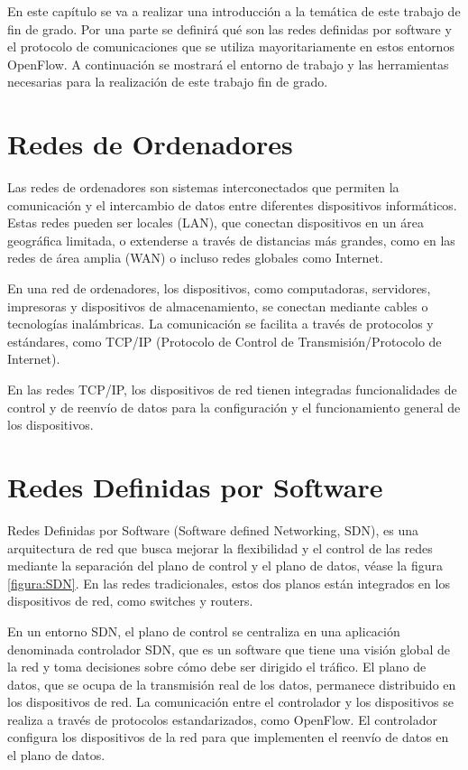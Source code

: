 \documentclass[a4paper, 12pt]{book}
\begin{document}
	
	En este capítulo se va a realizar una introducción a la temática de este trabajo de fin de grado. Por una
	parte se definirá qué son las redes definidas por software y el protocolo de comunicaciones que
	se utiliza mayoritariamente en estos entornos OpenFlow. A continuación se mostrará el entorno
	de trabajo y las herramientas necesarias para la realización de este trabajo fin de grado.
	
	
	\section{Redes de Ordenadores} 
	\label{sec:redes}
	
	Las redes de ordenadores son sistemas interconectados que permiten la comunicación y el intercambio de datos entre diferentes dispositivos informáticos. Estas redes pueden ser locales (LAN), que conectan dispositivos en un área geográfica limitada, o extenderse a través de distancias más grandes, como en las redes de área amplia (WAN) o incluso redes globales como Internet.
	
	En una red de ordenadores, los dispositivos, como computadoras, servidores, impresoras y dispositivos de almacenamiento, se conectan mediante cables o tecnologías inalámbricas. La comunicación se facilita a través de protocolos y estándares, como TCP/IP (Protocolo de Control de Transmisión/Protocolo de Internet).
	
	En las redes TCP/IP, los dispositivos de red tienen integradas funcionalidades de
	control y de reenvío de datos para la configuración	y el funcionamiento general de los dispositivos. 
	
	\section{Redes Definidas por Software} 
	\label{sec:sdn}
	
	Redes Definidas por Software (Software defined Networking, SDN), es una arquitectura de red que busca mejorar la flexibilidad y el control de las redes mediante la separación del plano de control y el plano de datos, véase la figura \ref{figura:SDN}. En las redes tradicionales, estos dos planos están integrados en los dispositivos de red, como switches y routers.
	
	En un entorno SDN, el plano de control se centraliza en una aplicación denominada controlador SDN, que es un software que tiene una visión global de la red y toma decisiones sobre cómo debe ser dirigido el tráfico. El plano de datos, que se ocupa de la transmisión real de los datos, permanece distribuido en los dispositivos de red. La comunicación entre el controlador y los dispositivos se realiza a través de protocolos estandarizados, como OpenFlow. El controlador configura los dispositivos de la red para que implementen el reenvío de datos en el plano de datos.
	
\end{document}
